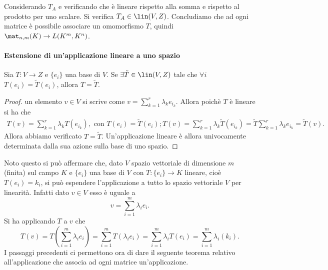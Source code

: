Considerando $T_A$ e verificando che è lineare rispetto alla somma e rispetto al prodotto per uno scalare.
Si verifica $T_A\in\lin(V,Z)$.
Concludiamo che ad ogni matrice è possibile associare un omomorfismo $T$, quindi $\mat_{n,m}(K)\to L(K^m,K^n)$.
\paragraph{Estensione di un'applicazione lineare a uno spazio}
\begin{lemma} \label{l:unicita-applicazione-definita-su-base}
	Sia  $T\colon V\to Z$ e $\{e_i\}$ una base di $V$.
	Se $\exists \tilde{T}\in\lin(V,Z)$ tale che $\forall i$ $T(e_i) = \tilde{T}(e_i)$, allora $T = \tilde{T}$. 
\end{lemma}
\begin{proof}
	un elemento $  v\in V$ si scrive come $  v = \sum_{k=1}^r \lambda_{k} e_{i_k}$. Allora poichè $T$ è lineare si ha che
	\begin{equation*}
		\begin{gathered}
			T(  v) = \sum_{k=1}^r \lambda_{k} T(e_{i_k}),\text{ con } T(e_i)=\tilde{T}(e_i);
			T(  v) = \sum_{k=1}^r \lambda_{k} \tilde{T}(e_{i_k}) =\tilde{T}\sum_{k=1}^r \lambda_{k} e_{i_k}=\tilde{T}(  v).
		\end{gathered}
	\end{equation*}
	Allora abbiamo verificato $T=\tilde{T}$.
	Un'applicazione lineare è allora univocamente determinata dalla sua azione sulla base di uno spazio.
\end{proof}
Noto questo si può affermare che, dato $V$ spazio vettoriale di dimensione $m$ (finita) sul campo $K$ e $\{e_i\}$ una base di $V$ con $T\colon\{e_i\}\to K$ lineare, cioè $T(e_{i}) =k_{i}$, si può espendere l'applicazione a tutto lo spazio vettoriale $V$ per linearità.
Infatti dato $  v\in V$ esso è uguale a
\begin{equation*}
	v = \sum_{i=1}^m \lambda_{i}e_{i}.
\end{equation*}
Si ha applicando $T$ a $  v$ che
\begin{equation*}
	T(  v) = T(\sum_{i=1}^m \lambda_{i}e_{i}) =\sum_{i=1}^m T(\lambda_{i}e_{i}) = \sum_{i=1}^m \lambda_{i} T(e_{i}) =\sum_{i=1}^m \lambda_{i} (k_{i}).
\end{equation*}
I passaggi precedenti ci permettono ora di dare il seguente teorema relativo all'applicazione che associa ad ogni matrice un'applicazione.

